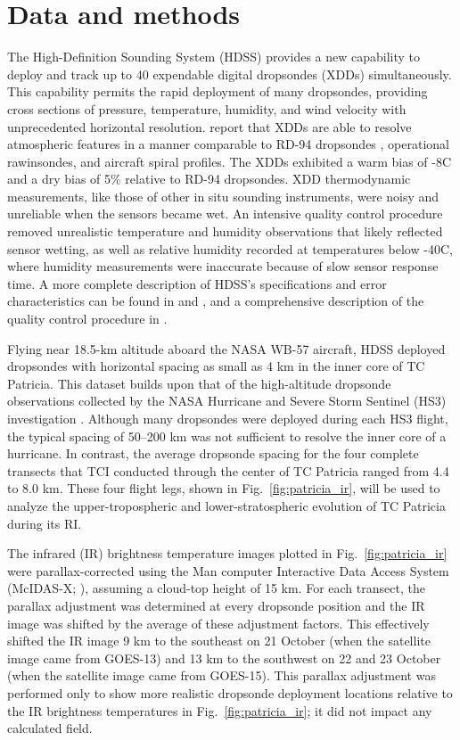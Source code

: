 \section{Data and methods}
The High-Definition Sounding System (HDSS) provides a new capability to deploy and track up to 40 expendable digital dropsondes (XDDs) simultaneously.
This capability permits the rapid deployment of many dropsondes, providing cross sections of pressure, temperature, humidity, and wind velocity with unprecedented horizontal resolution.
\cite{Blacketal2017} report that XDDs are able to resolve atmospheric features in a manner comparable to RD-94 dropsondes \citep{HockFranklin1999}, operational rawinsondes, and aircraft spiral profiles.
The XDDs exhibited a warm bias of -8\textdegree{}C and a dry bias of 5\% relative to RD-94 dropsondes.
XDD thermodynamic measurements, like those of other in situ sounding instruments, were noisy and unreliable when the sensors became wet.
An intensive quality control procedure \citep{BellTCI} removed unrealistic temperature and humidity observations that likely reflected sensor wetting, as well as relative humidity recorded at temperatures below -40\textdegree{}C, where humidity measurements were inaccurate because of slow sensor response time.
A more complete description of HDSS’s specifications and error characteristics can be found in \cite{Blacketal2017} and \cite{DoyleTCI}, and a comprehensive description of the quality control procedure in \cite{BellTCI}.

Flying near 18.5-km altitude aboard the NASA WB-57 aircraft, HDSS deployed dropsondes with horizontal spacing as small as 4 km in the inner core of TC Patricia.
This dataset builds upon that of the high-altitude dropsonde observations collected by the NASA Hurricane and Severe Storm Sentinel (HS3) investigation \citep{Braunetal2016}.
Although many dropsondes were deployed during each HS3 flight, the typical spacing of 50–200 km was not sufficient to resolve the inner core of a hurricane. In contrast, the average dropsonde spacing for the four complete transects that TCI conducted through the center of TC Patricia ranged from 4.4 to 8.0 km. 
These four flight legs, shown in Fig.~\ref{fig:patricia_ir}, will be used to analyze the upper-tropospheric and lower-stratospheric evolution of TC Patricia during its RI.

The infrared (IR) brightness temperature images plotted in Fig.~\ref{fig:patricia_ir} were parallax-corrected using the Man computer Interactive Data Access System (McIDAS-X; \citeauthor{Lazzaraetal1999} \citeyear{Lazzaraetal1999}), assuming a cloud-top height of 15 km.
For each transect, the parallax adjustment was determined at every dropsonde position and the IR image was shifted by the average of these adjustment factors.
This effectively shifted the IR image 9 km to the southeast on 21 October (when the satellite image came from GOES-13) and 13 km to the southwest on 22 and 23 October (when the satellite image came from GOES-15).
This parallax adjustment was performed only to show more realistic dropsonde deployment locations relative to the IR brightness temperatures in Fig.~\ref{fig:patricia_ir}; it did not impact any calculated field.

